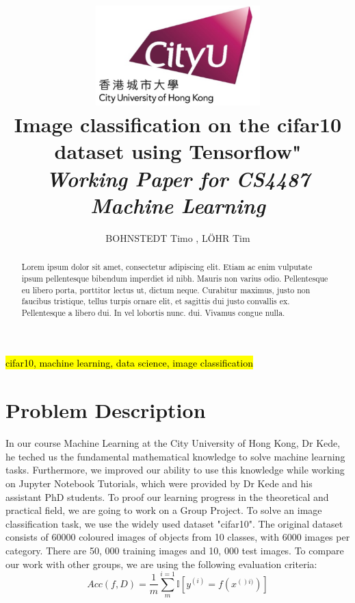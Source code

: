 \documentclass[journal]{IEEEtran}
\begin{document}
    \title{\includegraphics[width=2.5in]{photo/0_cityu} \\
    Image  classification on the cifar10 dataset using Tensorflow"\\
     \textit{Working Paper for CS4487 Machine Learning}
     }
  \author{BOHNSTEDT 	Timo ,
      L\"OHR Tim\\ 
}

\maketitle
\begin{abstract}
Lorem ipsum dolor sit amet, consectetur adipiscing elit. Etiam ac enim vulputate ipsum pellentesque bibendum imperdiet id nibh. Mauris non varius odio. Pellentesque eu libero porta, porttitor lectus ut, dictum neque. Curabitur maximus, justo non faucibus tristique, tellus turpis ornare elit, et sagittis dui justo convallis ex. Pellentesque a libero dui. In vel lobortis nunc. dui. Vivamus congue nulla.
\end{abstract}

\begin{IEEEkeywords}
\hl{cifar10, machine learning, data science, image classification}
\end{IEEEkeywords}

\IEEEpeerreviewmaketitle

\section{Problem Description}
In our course Machine Learning at the City University of Hong Kong, Dr Kede, he teched us the fundamental mathematical knowledge to solve machine learning tasks. Furthermore, we improved our ability to use this knowledge while working on Jupyter Notebook Tutorials, which were provided by Dr Kede and his assistant PhD students. To proof our learning progress in the theoretical and practical field, we are going to work on a Group Project. To solve an image classification task, we use the widely used dataset "cifar10". The original dataset consists of 60000 coloured images of objects from 10 classes, with 6000 images per category. There are 50, 000 training images and 10, 000 test images. To compare our work with other groups, we are using the following evaluation criteria:
\begin{equation}
Acc(f,D) = \frac{1}{m}\sum_{m}^{i=1} \mathbb{I} \left [ y^{(i)} =f(x^{()i)})\right ]
\end{equation}
\end{document}
